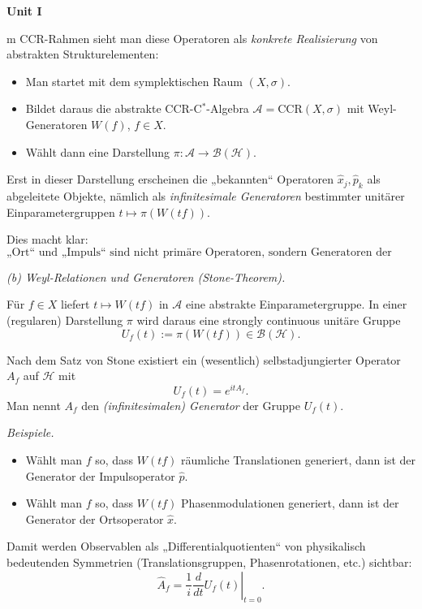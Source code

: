 \documentclass[10pt, letterpaper]{article}
\newenvironment{unit}[1]
  {\begin{unitbox}\textbf{Unit #1}\par\smallskip}
  {\end{unitbox}}
\begin{document}
\begin{unit}
Im CCR-Rahmen sieht man diese Operatoren als \emph{konkrete Realisierung}
von abstrakten Strukturelementen:
\begin{itemize}
  \item Man startet mit dem symplektischen Raum \((X,\sigma)\).
  \item Bildet daraus die abstrakte CCR-C$^\ast$-Algebra \(\mathcal{A}=\mathrm{CCR}(X,\sigma)\)
        mit Weyl-Generatoren \(W(f)\), \(f\in X\).
  \item Wählt dann eine Darstellung \(\pi:\mathcal{A}\to\mathcal{B}(\mathcal{H})\).
\end{itemize}

Erst in dieser Darstellung erscheinen die „bekannten“ Operatoren
\(\hat{x}_j,\hat{p}_k\) als abgeleitete Objekte,
nämlich als \emph{infinitesimale Generatoren} bestimmter unitärer Einparametergruppen
\(t\mapsto \pi(W(tf))\).

Dies macht klar:
\[
\boxed{
\text{„Ort“ und „Impuls“ sind nicht primäre Operatoren, 
sondern Generatoren der abstrakten CCR-Struktur.}
}
\]

\medskip

\emph{(b) Weyl-Relationen und Generatoren (Stone-Theorem).}

Für \(f\in X\) liefert \(t\mapsto W(tf)\) in \(\mathcal{A}\)
eine abstrakte Einparametergruppe.
In einer (regularen) Darstellung \(\pi\) wird daraus
eine strongly continuous unitäre Gruppe
\[
U_f(t) := \pi(W(tf)) \in \mathcal{B}(\mathcal{H}).
\]

Nach dem Satz von Stone existiert ein (wesentlich) selbstadjungierter Operator
\(A_f\) auf \(\mathcal{H}\) mit
\[
U_f(t) = e^{itA_f}.
\]
Man nennt \(A_f\) den \emph{(infinitesimalen) Generator} der Gruppe \(U_f(t)\).

\emph{Beispiele.}
\begin{itemize}
  \item Wählt man \(f\) so, dass \(W(tf)\) räumliche Translationen generiert,
        dann ist der Generator der Impulsoperator \(\hat{p}\).
  \item Wählt man \(f\) so, dass \(W(tf)\) Phasenmodulationen generiert,
        dann ist der Generator der Ortsoperator \(\hat{x}\).
\end{itemize}

Damit werden Observablen als „Differentialquotienten“ von physikalisch
bedeutenden Symmetrien (Translationsgruppen, Phasenrotationen, etc.)
sichtbar:
\[
\hat{A}_f = \left.\frac{1}{i}\frac{d}{dt}U_f(t)\right|_{t=0}.
\]


\end{unit}
\end{document}
